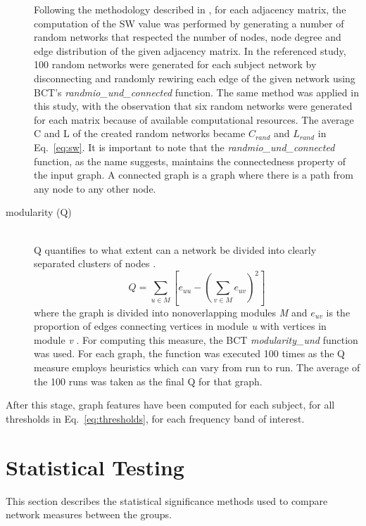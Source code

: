 \begin{description}
			  Following the methodology described in \textcite{Rudie2012}, for each adjacency matrix, the computation of the \ac{SW} value was performed by generating a number of random networks that respected the number of nodes, node degree and edge distribution of the given adjacency matrix. In the referenced study, 100 random networks were generated for each subject network by disconnecting and randomly rewiring each edge of the given network using \ac{BCT}'s \textit{randmio_und_connected} function. The same method was applied in this study, with the observation that six random networks were generated for each matrix because of available computational resources. The average \ac{C} and \ac{L} of the created random networks became \(C_{rand}\) and \(L_{rand}\) in Eq.~\ref{eq:sw}. It is important to note that the \textit{randmio_und_connected} function, as the name suggests, maintains the connectedness property of the input graph. A connected graph is a graph where there is a path from any node to any other node.     

			  \item[modularity (Q)] \hfill \\
			  \ac{Q} quantifies to what extent can a network be divided into clearly separated clusters of nodes \autocite{Newman2003}.
			  \begin{equation}\label{eq:q}		
				Q = \sum\limits_{u \in M} \left[ e_{uu} - \left(\sum\limits_{v \in M} e_{uv} \right)^2 \right]
			  \end{equation}
			  where the graph is divided into nonoverlapping modules \textit{M} and \(e_{uv}\) is the proportion of edges connecting vertices in module \textit{u} with vertices in module \textit{v} \autocite{Rubinov2010}. 
			  For computing this measure, the \ac{BCT} \textit{modularity_und} function was used. For each graph, the function was executed 100 times as the \ac{Q} measure employs heuristics which can vary from run to run. The average of the 100 runs was taken as the final \ac{Q} for that graph.
		\end{description}

		After this stage, graph features have been computed for each subject, for all thresholds in Eq.~\ref{eq:thresholds}, for each frequency band of interest. 


	\section{Statistical Testing}
	This section describes the statistical significance methods used to compare network measures between the groups.
		
